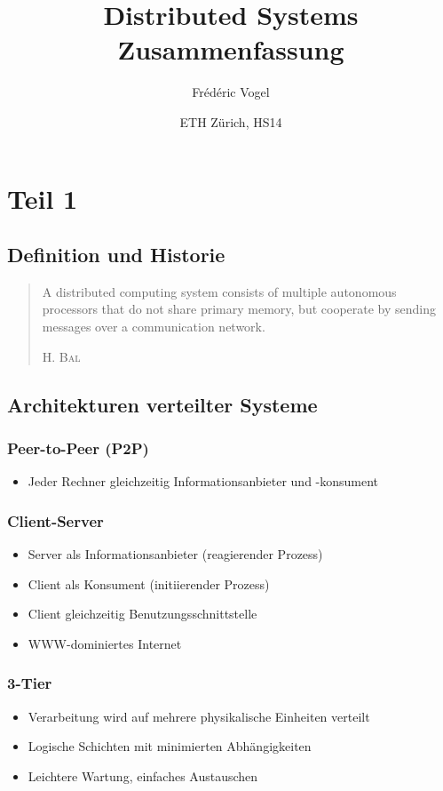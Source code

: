 \documentclass[10pt,a4paper]{article}
\title{Distributed Systems\\Zusammenfassung}
\author{Frédéric Vogel}
\date{ETH Zürich, HS14}
\begin{document}
\maketitle

\tableofcontents

\pagebreak

\section{Teil 1}
\subsection{Definition und Historie}
\begin{quote}
A distributed computing system consists of multiple autonomous processors that do not share primary memory, but cooperate by sending messages over a communication network.

\textsc{H. Bal}
\end{quote}


\subsection{Architekturen verteilter Systeme}
\subsubsection{Peer-to-Peer (P2P)}
\begin{itemize}
\item Jeder Rechner gleichzeitig Informationsanbieter und -konsument
\end{itemize}

\subsubsection{Client-Server}
\begin{itemize}
\item Server als Informationsanbieter (reagierender Prozess)
\item Client als Konsument (initiierender Prozess)
\item Client gleichzeitig Benutzungsschnittstelle
\item WWW-dominiertes Internet
\end{itemize}

\subsubsection{3-Tier}
\begin{itemize}
\item Verarbeitung wird auf mehrere physikalische Einheiten verteilt
\item Logische Schichten mit minimierten Abhängigkeiten
\item Leichtere Wartung, einfaches Austauschen
\end{itemize}
\end{document}
